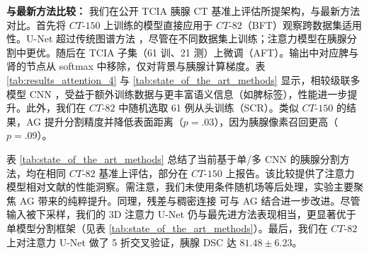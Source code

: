 \documentclass{article}
\begin{document}
\textbf{与最新方法比较：} 我们在公开 TCIA 胰腺 CT 基准上评估所提架构，与最新方法对比。首先将 $CT$-$150$ 上训练的模型直接应用于 $CT$-$82$（BFT）观察跨数据集适用性。U-Net 超过传统图谱方法 \cite{wolz2013automated}，尽管在不同数据集上训练；注意力模型在胰腺分割中更优。随后在 TCIA 子集（61 训、21 测）上微调（AFT）。输出中对应脾与肾的节点从 softmax 中移除，仅对背景与胰腺计算梯度。表 \ref{tab:results_attention_4} 与 \ref{tab:state_of_the_art_methods} 显示，相较级联多模型 CNN \cite{cai2017improving, roth2018media, zhou2017fixed}，受益于额外训练数据与更丰富语义信息（如脾标签），性能进一步提升。此外，我们在 $CT$-$82$ 中随机选取 61 例从头训练（SCR）。类似 $CT$-$150$ 的结果，AG 提升分割精度并降低表面距离（$p = .03$），因为胰腺像素召回更高（$p = .09$）。 

表 \ref{tab:state_of_the_art_methods} 总结了当前基于单/多 CNN 的胰腺分割方法，均在相同 $CT$-$82$ 基准上评估，部分在 $CT$-$150$ 上报告。该比较提供了注意力模型相对文献的性能洞察。需注意，我们未使用条件随机场等后处理，实验主要聚焦 AG 带来的纯粹提升。同理，残差与稠密连接 \cite{gibson2017towards} 可与 AG 结合进一步改进。尽管输入被下采样，我们的 3D 注意力 U-Net 仍与最先进方法表现相当，更显著优于单模型分割框架（见表 \ref{tab:state_of_the_art_methods}）。最后，我们在 $CT$-$82$ 上对注意力 U-Net 做了 5 折交叉验证，胰腺 DSC 达 $81.48\pm6.23$。 
\end{document}
